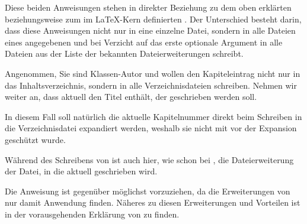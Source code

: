 \begin{Declaration}
\end{Declaration}
Diese beiden Anweisungen stehen in direkter Beziehung zu dem oben erklärten
beziehungsweise zum im \LaTeX-Kern definierten . Der
Unterschied besteht darin, dass diese Anweisungen  nicht nur in
eine einzelne Datei, sondern in alle Dateien eines angegebenen
 und bei Verzicht auf das erste optionale Argument in alle
Dateien aus der Liste der bekannten Dateierweiterungen schreibt.
\begin{Example}
  Angenommen, Sie sind Klassen-Autor und wollen den Kapiteleintrag nicht nur in
  das Inhaltsverzeichnis, sondern in alle Verzeichnisdateien schreiben. Nehmen
  wir weiter an, dass aktuell  den Titel enthält, der geschrieben
  werden soll.
  In diesem Fall soll natürlich die aktuelle Kapitelnummer direkt beim
  Schreiben in die Verzeichnisdatei expandiert werden, weshalb sie nicht mit
   vor der Expansion geschützt wurde.
\end{Example}
Während des Schreibens von  ist auch hier, wie schon bei
,
 die
Dateierweiterung der Datei, in die aktuell geschrieben wird.%

Die Anweisung
 ist gegenüber
 möglichst vorzuziehen, da die
Erweiterungen von  nur damit
Anwendung finden. Näheres zu diesen Erweiterungen und Vorteilen ist in der
vorausgehenden Erklärung von  zu
finden.%
%
\EndIndexGroup


